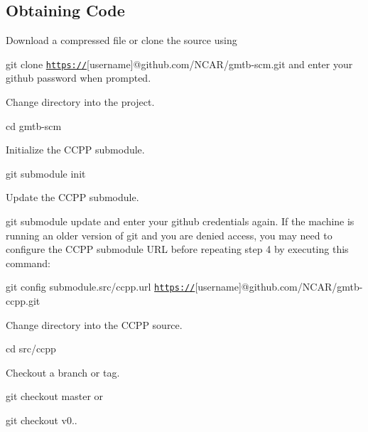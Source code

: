 \subsection*{Obtaining Code}


\begin{DoxyEnumerate}
\item Download a compressed file or clone the source using
\end{DoxyEnumerate}
\begin{DoxyItemize}
\item {\ttfamily git clone \href{https://}{\tt https\+://}\mbox{[}username\mbox{]}@github.\+com/\+N\+C\+A\+R/gmtb-\/scm.git} and enter your github password when prompted.
\end{DoxyItemize}
\begin{DoxyEnumerate}
\item Change directory into the project.
\end{DoxyEnumerate}
\begin{DoxyItemize}
\item {\ttfamily cd gmtb-\/scm}
\end{DoxyItemize}
\begin{DoxyEnumerate}
\item Initialize the C\+C\+PP submodule.
\end{DoxyEnumerate}
\begin{DoxyItemize}
\item {\ttfamily git submodule init}
\end{DoxyItemize}
\begin{DoxyEnumerate}
\item Update the C\+C\+PP submodule.
\end{DoxyEnumerate}
\begin{DoxyItemize}
\item {\ttfamily git submodule update} and enter your github credentials again. If the machine is running an older version of git and you are denied access, you may need to configure the C\+C\+PP submodule U\+RL before repeating step 4 by executing this command\+:
\item {\ttfamily git config submodule.\+src/ccpp.url \href{https://}{\tt https\+://}\mbox{[}username\mbox{]}@github.\+com/\+N\+C\+A\+R/gmtb-\/ccpp.git}
\end{DoxyItemize}
\begin{DoxyEnumerate}
\item Change directory into the C\+C\+PP source.
\end{DoxyEnumerate}
\begin{DoxyItemize}
\item {\ttfamily cd src/ccpp}
\end{DoxyItemize}
\begin{DoxyEnumerate}
\item Checkout a branch or tag.
\end{DoxyEnumerate}
\begin{DoxyItemize}
\item {\ttfamily git checkout master} or
\item {\ttfamily git checkout v0..}
\end{DoxyItemize}

